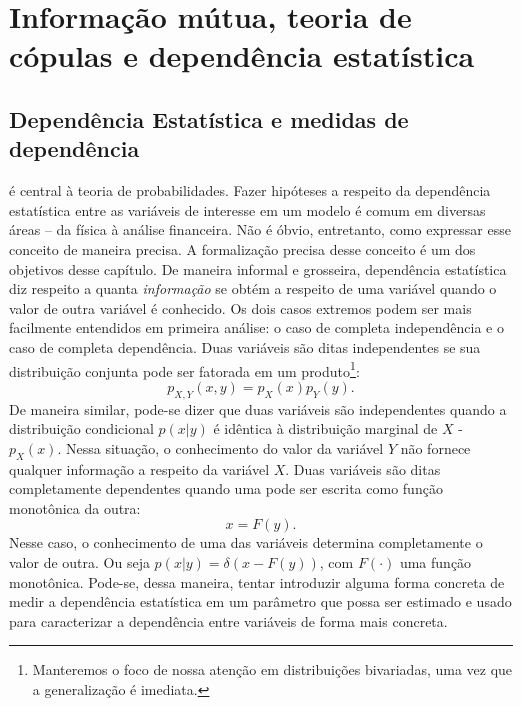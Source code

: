 \chapter{Informação mútua, teoria de cópulas e dependência estatística}
\section{Dependência Estatística e medidas de dependência}


 é central à teoria de probabilidades. Fazer hipóteses a respeito da dependência estatística entre as variáveis de interesse em um modelo é comum em diversas áreas -- da física à análise financeira. Não é óbvio, entretanto, como expressar esse conceito de maneira precisa. A formalização precisa desse conceito é um dos objetivos desse capítulo. De maneira informal e grosseira, dependência estatística diz respeito a quanta \textit{informação} se obtém a respeito de uma variável quando o valor de outra variável é conhecido. Os dois casos extremos podem ser mais facilmente entendidos em primeira análise: o caso de completa independência e o caso de completa dependência. Duas variáveis são ditas independentes se sua distribuição conjunta pode ser fatorada em um produto\footnote{Manteremos o foco de nossa atenção em distribuições bivariadas, uma vez que a generalização é imediata.}:
\begin{equation}
\label{eq:independence}
 p_{X,Y}(x,y) = p_{X}(x)p_{Y}(y).
\end{equation}
De maneira similar, pode-se dizer que duas variáveis são independentes quando a distribuição condicional $p(x|y)$ é idêntica à distribuição marginal de $X$ - $p_{X}(x)$. Nessa situação, o conhecimento do valor da variável $Y$ não fornece qualquer informação a respeito da variável $X$. Duas variáveis são ditas completamente dependentes quando uma pode ser escrita como função monotônica da outra:
\begin{equation}
x = F(y).
\end{equation}
Nesse caso, o conhecimento de uma das variáveis determina completamente o valor de outra. Ou seja $p(x | y)  = \delta(x - F(y))$, com $F(\cdot)$ uma função monotônica. Pode-se, dessa maneira, tentar introduzir alguma forma concreta de medir a dependência estatística em um parâmetro que possa ser estimado e usado para caracterizar a dependência entre variáveis de forma mais concreta.

